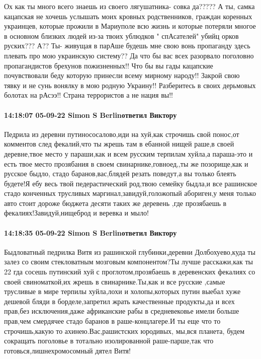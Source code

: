 Ох как ты много всего знаешь из своего лягушатника- совка да????? А ты, самка
кацапская не хочешь услышать моих кровных родственников, граждан коренных
украинцев, которые прожили в Мариуполе всю жизнь и которые потеряли многое в
основном близких людей из-за твоих ублюдков " спАсателей" убийц орков руских???
А?? Ты- живущая в парАше будешь мне свою вонь пропаганду здесь плевать про мою
украинскую систему?? Да что бы вас всех разорвало поголовно пропагандистов
брехунов пожизненных!! Что бы вы гады кацапские почувствовали беду которую
принесли всему мирному народу!! Закрой свою тявку и не сунь вонялку в мою
родную Украину!! Разберитесь в своих дерьмовых болотах на рАсээ!! Страна
террористов а не нация вы!!

\paragraph{14:18:07 05-09-22 Simon S Berlinответил Виктору}

Педрила из деревни путинососалово,иди на хуй,как строчишь свой понос,от
комментов след фекалий,что ты жрешь там в ебанной нищей раше,в своей
деревне,твое место у параши,как и всем русским терпилам хуйла,а параша-это и
есть твое место прозябания в своем свинарнике,говноед,,ты же позорище,как и
русское быдло, стадо баранов,вас,блядей резать поведут,а вы только блеять
будете!Я ебу весь твой педерастический род,твою семейку быдла,и все рашинское
стадо конченных трусливых маргинал,завидуй,голожопый абориген,у меня только
авто стоит дороже бюджета десяти таких же деревень ,где прозябаешь в
фекалиях!Завидуй,нищеброд и веревка и мыло!

\paragraph{14:18:35 05-09-22 Simon S Berlinответил Виктору}

Быдловатный педрилка Витя из рашинской глубинки,деревни Долбохуево,куда ты
залез со своим стекловатным мозговым компонентом?Ты лучше расскажи,как ты 22
гда сосешь путинский хуй с проглотом,прозябаешь в деревенских фекалиях со своей
свиноматкой,их жрешь в свинарнике.Ты,как и все русские ,самые трусливые в мире
терпилы хуйла,лохи и холопы,которых путин выебал хуже дешевой бляди в
борделе,запретил жрать качественные продукты,да и всех прав,без исключения,даже
африканские рабы в средневековье имели больше прав,чем смердячее стадо баранов
в раше-концлагере.И ты еще что то строчишь,какую то ахинею.Вас,рашистских
юродивых, мы,вся планета, будем сокращать поголовье в тотально изолированной
раше-парше,так что готовься,лишнехромосомный дятел Витя!

